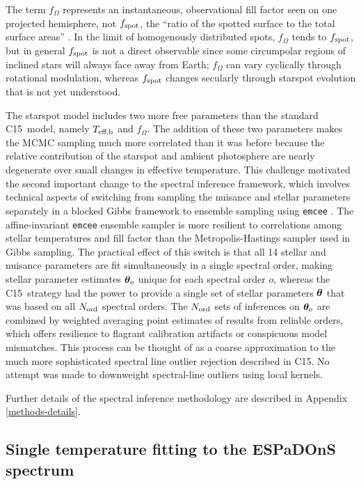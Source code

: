 \documentclass[twocolumn]{emulateapj}%
\newcommand{\iancze}{{\sc C15}}
\begin{document}
The term $f_{\Omega}$ represents an instantaneous, observational fill factor seen on one projected hemisphere, not $f_{\rm spot}$, the ``ratio of the spotted surface to the total surface areas'' \citep{somers15}.  In the limit of homogenously distributed spots, $f_{\Omega}$ tends to $f_{\rm spot}$, but in general $f_{\rm spot}$ is not a direct observable since some circumpolar regions of inclined stars will always face away from Earth; $f_{\Omega}$ can vary cyclically through rotational modulation, whereas $f_{\rm spot}$ changes secularly through starspot evolution that is not yet understood.

The starspot model includes two more free parameters than the standard \iancze\ model, namely $T_\textrm{eff,b}$ and $f_{\Omega}$.  The addition of these two parameters makes the MCMC sampling much more correlated than it was before because the relative contribution of the starspot and ambient photosphere are nearly degenerate over small changes in effective temperature.  This challenge motivated the second important change to the spectral inference framework, which involves technical aspects of switching from sampling the nuisance and stellar parameters separately in a blocked Gibbs framework to ensemble sampling using \texttt{emcee} \citep{foreman13}.  The affine-invariant \texttt{emcee} ensemble sampler is more resilient to correlations among stellar temperatures and fill factor than the Metropolis-Hastings sampler used in Gibbs sampling.  The practical effect of this switch is that all 14 stellar and nuisance parameters are fit simultaneously in a single spectral order, making stellar parameter estimates ${\bm \theta}_{o}$ unique for each spectral order $o$, whereas the \iancze\ strategy had the power to provide a single set of stellar parameters ${\bm \theta}$ that was based on all $N_{\rm ord}$ spectral orders.  The $N_{\rm ord}$ sets of inferences on ${\bm \theta}_{o}$ are combined by weighted averaging point estimates of results from reliable orders, which offers resilience to flagrant calibration artifacts or conspicuous model mismatches.  This process can be thought of as a coarse approximation to the much more sophisticated spectral line outlier rejection described in \iancze.  No attempt was made to downweight spectral-line outliers using local kernels.

Further details of the spectral inference methodology are described in Appendix \ref{methods-details}.


\subsection{Single temperature fitting to the ESPaDOnS spectrum}\label{sec:ESP_starfish}
\end{document}

